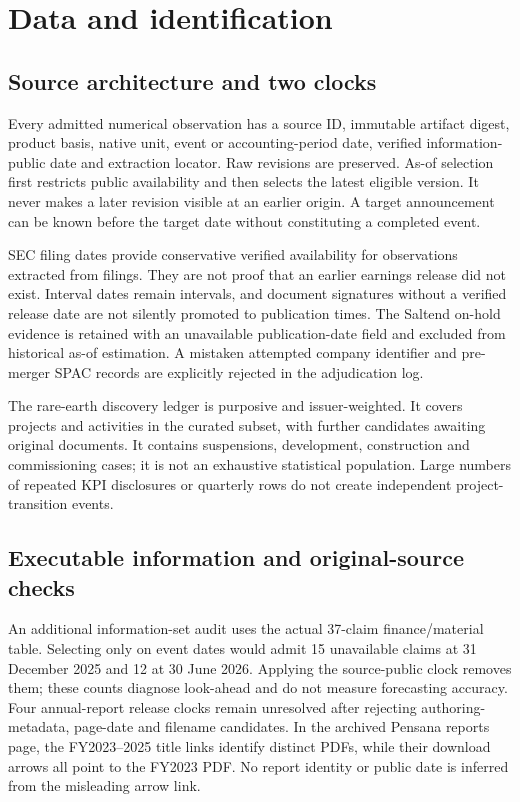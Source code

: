 \documentclass[11pt]{article}
\begin{document}
\section{Data and identification}
\subsection{Source architecture and two clocks}
Every admitted numerical observation has a source ID, immutable artifact digest, product basis, native unit, event or accounting-period date, verified information-public date and extraction locator. Raw revisions are preserved. As-of selection first restricts public availability and then selects the latest eligible version. It never makes a later revision visible at an earlier origin. A target announcement can be known before the target date without constituting a completed event.

SEC filing dates provide conservative verified availability for observations extracted from filings. They are not proof that an earlier earnings release did not exist. Interval dates remain intervals, and document signatures without a verified release date are not silently promoted to publication times. The Saltend on-hold evidence is retained with an unavailable publication-date field and excluded from historical as-of estimation. A mistaken attempted company identifier and pre-merger SPAC records are explicitly rejected in the adjudication log.

The rare-earth discovery ledger is purposive and issuer-weighted. It covers \ProjectCount{} projects and \ActivityCount{} activities in the curated subset, with further candidates awaiting original documents. It contains suspensions, development, construction and commissioning cases; it is not an exhaustive statistical population. Large numbers of repeated KPI disclosures or quarterly rows do not create independent project-transition events.

\subsection{Executable information and original-source checks}
An additional information-set audit uses the actual 37-claim finance/material table. Selecting only on event dates would admit 15 unavailable claims at 31 December 2025 and 12 at 30 June 2026. Applying the source-public clock removes them; these counts diagnose look-ahead and do not measure forecasting accuracy. Four annual-report release clocks remain unresolved after rejecting \RejectedDateCandidates{} authoring-metadata, page-date and filename candidates. In the archived Pensana reports page, the FY2023--2025 title links identify distinct PDFs, while their download arrows all point to the FY2023 PDF. No report identity or public date is inferred from the misleading arrow link.
\end{document}
